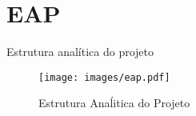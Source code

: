 \newpage
\section{\gls{EAP}}
Estrutura analítica do projeto\\

\begin{figure}
\centering
\texttt{[image: images/eap.pdf]}
\caption{Estrutura Anaĺitica do Projeto}
\end{figure}